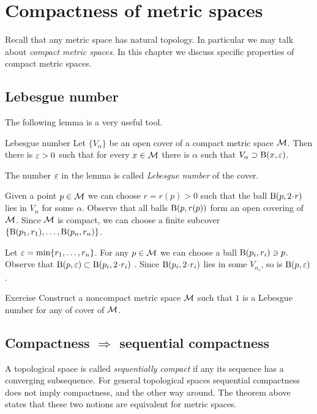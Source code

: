 \chapter{Compactness of metric spaces}

Recall that any metric space has natural topology.
In particular we may talk about \emph{compact metric spaces}.
In this chapter we discuss specific properties of compact metric spaces.

\section{Lebesgue number}

The following lemma is a very useful tool.

\begin{thm}{Lebesgue number}\label{prop:lebesgue-number}
Let $\{V_\alpha\}$ be an open cover of a compact metric space $\mathcal{M}$.
Then there is $\varepsilon > 0$ such that for every $x\in\mathcal{M}$ there is $\alpha$ such that $V_\alpha\supset \mathrm{B}(x,\varepsilon)$.
\end{thm}

The number $\varepsilon$ in the lemma is called \emph{Lebesgue number} of the cover.

Given a point $p\in \mathcal{M}$ we can choose $r=r(p)>0$ such that the ball $\Ball(p,2\cdot r)$ lies in $V_\alpha$ for some $\alpha$.
Observe that all balls $\mathrm{B}(p,r(p))$ form an open covering of $\mathcal{M}$.
Since $\mathcal{M}$ is compact, we can choose a finite subcover $\{\mathrm{B}(p_1,r_1),\dots,\mathrm{B}(p_n,r_n)\}$.

Let $\varepsilon=\min\{r_1,\dots,r_n\}$.
For any $p\in\mathcal{M}$ we can choose a ball $\mathrm{B}(p_i,r_i)\ni p$.
Observe that $\Ball(p,\eps)\subset \Ball(p_i,2\cdot r_i)$ .
Since $\Ball(p_i,2\cdot r_i)$ lies in some $V_{\alpha_i}$, so is $\mathrm{B}(p,\varepsilon)$.
\qeds


\begin{thm}{Exercise}\label{ex:lebesgue=1}
Construct a noncompact metric space $\mathcal{M}$ such that $1$ is a Lebesgue number for any of cover of $\mathcal{M}$. 
\end{thm}

\section[\texorpdfstring{Compactness $\Rightarrow$ sequential compactness}{Compactness ⇒ sequential compactness}]{Compactness $\bm{\Rightarrow}$ sequential compactness}

A topological space is called \emph{sequentially compact} if any its sequence has a converging subsequence.
For general topological spaces sequential compactness does not imply compactness, and the other way around.
The theorem above states that these two notions are equivalent for metric spaces.

